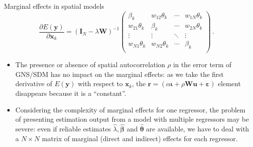 \documentclass{beamer}
\begin{document}
\begin{frame}{Marginal effects in spatial models}
\begin{equation*}
\frac{\partial E(\bm{y})}{\partial \bm{x}_k}
    =(\bm{I}_N - \lambda \bm{W})^{-1}
	\begin{pmatrix}
		\beta_{k} & w_{12}\theta_{k}& \cdots & w_{1N}\theta_{k}\\
		w_{21}\theta_{k}& \beta_{k} & \cdots & w_{2N}\theta_{k}\\
		\vdots & \vdots & \ddots & \vdots \\
		w_{N1}\theta_{k} & w_{N2}\theta_{k} & \cdots & \beta_{k} \\
	\end{pmatrix}\,. 
\end{equation*}
\begin{itemize}
    \item The presence or absence of spatial autocorrelation $\rho$ in the error term of GNS/SDM has no impact on the marginal effects: as we take the first derivative of $E(\bm{y})$ with respect to $\bm{x}_k$, the $\bm{r}= (\alpha \bm{\iota} + \rho \bm{W\!u} + \bm{\varepsilon})$ element disappears because it is a ``constant''.
    \medskip
    \item Considering the complexity of marginal effects for one regressor, the problem of presenting estimation output from a model with multiple regressors may be severe: even if reliable estimates $\hat{\lambda}, \hat{\bm{\beta}}$ and $\hat{\bm{\theta}}$ are available, we have to deal with a $N\!\times\!N$ matrix of marginal (direct and indirect) effects for each regressor.
\end{itemize}	
\end{frame}
\end{document}
